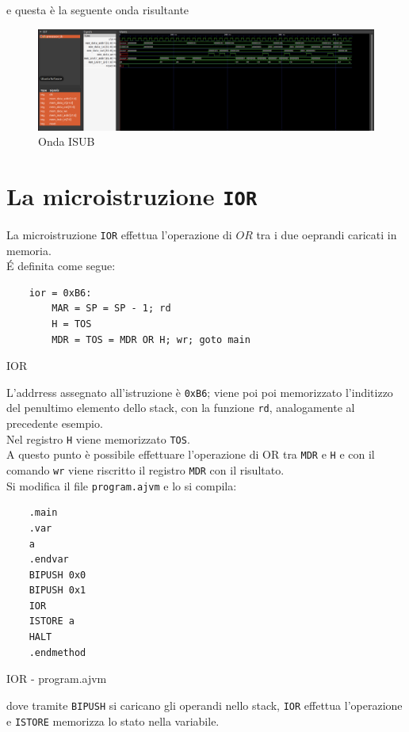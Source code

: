 e questa è la seguente onda risultante
\begin{figure}[H]
	\centering
	\includegraphics[width=1\textwidth]{img/Esercizio_9/sub_wave}
	\caption{Onda ISUB}
	\label{sub_wave}
\end{figure}


\section{La microistruzione \texttt{IOR}}
La microistruzione \texttt{IOR} effettua l'operazione di $OR$ tra i due oeprandi caricati in memoria.\\
\'E definita come segue:
\begin{listing}[H]
    \begin{verbatim}
    ior = 0xB6:
        MAR = SP = SP - 1; rd
        H = TOS
        MDR = TOS = MDR OR H; wr; goto main
    \end{verbatim}
    \caption{IOR}
\end{listing}
L'addrress assegnato all'istruzione è \texttt{0xB6}; viene poi poi memorizzato l'inditizzo del penultimo elemento dello stack, con la funzione \texttt{rd}, analogamente al precedente esempio.\\
Nel registro \texttt{H} viene memorizzato \texttt{TOS}.\\
A questo punto è possibile effettuare l'operazione di OR tra \texttt{MDR} e \texttt{H} e con il comando \texttt{wr} viene riscritto il registro \texttt{MDR} con il risultato.\\
Si modifica il file \texttt{program.ajvm} e lo si compila: 
\begin{listing}[H]
    \begin{verbatim}
    .main
    .var
    a
    .endvar
    BIPUSH 0x0
    BIPUSH 0x1
    IOR
    ISTORE a
    HALT
    .endmethod
    \end{verbatim}
    \caption{IOR - program.ajvm}
\end{listing}
dove tramite \texttt{BIPUSH} si caricano gli operandi nello stack, \texttt{IOR} effettua l'operazione e \texttt{ISTORE} memorizza lo stato nella variabile.


